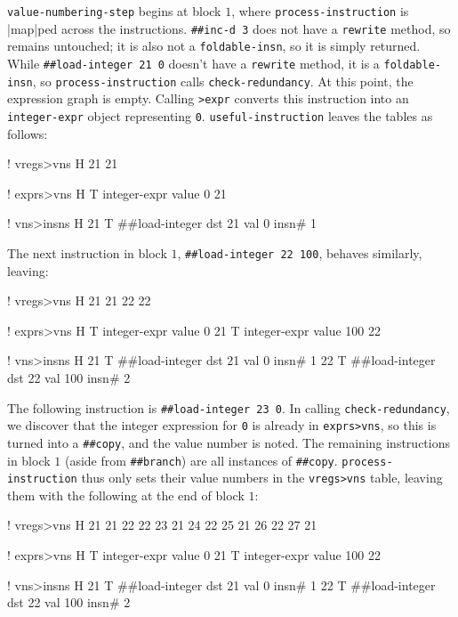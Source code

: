 \Verb|value-numbering-step| begins at block $1$, where
\Verb|process-instruction| is \factor|map|ped across the instructions.
%
\Verb|##inc-d 3|
%
does not have a \Verb|rewrite| method, so remains untouched; it is also not a
\Verb|foldable-insn|, so it is simply returned.  While
%
\Verb|##load-integer 21 0|
%
doesn't have a \Verb|rewrite| method, it is a \Verb|foldable-insn|, so
\Verb|process-instruction| calls \Verb|check-redundancy|.  At this point,
the expression graph is empty.  Calling \Verb|>expr| converts this
instruction into an \Verb|integer-expr| object representing \Verb|0|.
\Verb|useful-instruction| leaves the tables as follows:
%
  \begin{factorcode}
    ! vregs>vns
    H{ { 21 21 } }

    ! exprs>vns
    H{ { T{ integer-expr { value 0 } } 21 } }

    ! vns>insns
    H{
        { 21 T{ ##load-integer { dst 21 } { val 0 } { insn# 1 } } }
    }
  \end{factorcode}
%
\noindent The next instruction in block $1$,
%
\Verb|##load-integer 22 100|,
%
behaves similarly, leaving:
%
  \begin{factorcode}
    ! vregs>vns
    H{ { 21 21 } { 22 22 } }

    ! exprs>vns
    H{
        { T{ integer-expr { value 0 } } 21 }
        { T{ integer-expr { value 100 } } 22 }
    }

    ! vns>insns
    H{
        { 21 T{ ##load-integer { dst 21 } { val 0 } { insn# 1 } } }
        {
            22
            T{ ##load-integer { dst 22 } { val 100 } { insn# 2 } }
        }
    }
  \end{factorcode}
%
\noindent The following instruction is
%
\Verb|##load-integer 23 0|.
%
In calling \Verb|check-redundancy|, we discover that the integer expression
for \Verb|0| is already in \Verb|exprs>vns|, so this is turned into a
\Verb|##copy|, and the value number is noted.  The remaining instructions in
block $1$ (aside from \Verb|##branch|) are all instances of \Verb|##copy|.
\Verb|process-instruction| thus only sets their value numbers in the
\Verb|vregs>vns| table, leaving them with the following at the end of block
$1$:
%
  \begin{factorcode}
    ! vregs>vns
    H{
        { 21 21 }
        { 22 22 }
        { 23 21 }
        { 24 22 }
        { 25 21 }
        { 26 22 }
        { 27 21 }
    }

    ! exprs>vns
    H{
        { T{ integer-expr { value 0 } } 21 }
        { T{ integer-expr { value 100 } } 22 }
    }

    ! vns>insns
    H{
        { 21 T{ ##load-integer { dst 21 } { val 0 } { insn# 1 } } }
        {
            22
            T{ ##load-integer { dst 22 } { val 100 } { insn# 2 } }
        }
    }
  \end{factorcode}

